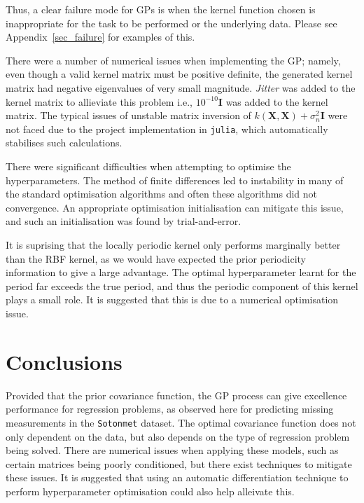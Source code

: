 \documentclass[a4paper, twocolumn, 10pt]{article}
\begin{document}
Thus, a clear failure mode for GPs is when the kernel function chosen is inappropriate for the task to be performed or the underlying data. Please see Appendix~\ref{sec_failure} for examples of this. 

There were a number of numerical issues when implementing the GP; namely, even though a valid kernel matrix must be positive definite, the generated kernel matrix had negative eigenvalues of very small magnitude. \emph{Jitter} was added to the kernel matrix to allieviate this problem i.e., $10^{-10}\bm{I}$ was added to the kernel matrix. The typical issues of unstable matrix inversion of $k(\bm{X}, \bm{X}) + \sigma_n^2 \bm{I} $ were not faced due to the project implementation in \texttt{julia}, which automatically stabilises such calculations.

There were significant difficulties when attempting to optimise the hyperparameters. The method of finite differences led to instability in many of the standard optimisation algorithms and often these algorithms did not convergence. An appropriate optimisation initialisation can mitigate this issue, and such an initialisation was found by trial-and-error.

It is suprising that the locally periodic kernel only performs marginally better than the RBF kernel, as we would have expected the prior periodicity information to give a large advantage. The optimal hyperparameter learnt for the period far exceeds the true period, and thus the periodic component of this kernel plays a small role. It is suggested that this is due to a numerical optimisation issue. 

\section{Conclusions}
Provided that the prior covariance function, the GP process can give excellence performance for regression problems, as observed here for predicting missing measurements in the  \texttt{Sotonmet} dataset. The optimal covariance function does not only dependent on the data, but also depends on the type of regression problem being solved. There are numerical issues when applying these models, such as certain matrices being poorly conditioned, but there exist techniques to mitigate these issues. It is suggested that using an automatic differentiation technique to perform hyperparameter optimisation could also help alleivate this. 




\end{document}
